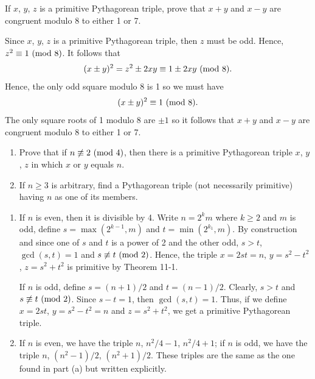 \begin{exercise}
    If $x$, $y$, $z$ is a primitive Pythagorean triple, prove that $x + y$ and $x-y$ are congruent modulo 8 to either 1 or 7. \\
\end{exercise}

\begin{solution}
    Since $x$, $y$, $z$ is a primitive Pythagorean triple, then $z$ must be odd. Hence, $z^2 \equiv 1 \ (\mathrm{mod}\ 8)$. It follows that
    $$(x\pm y)^2 = z^2 \pm 2xy \equiv 1 \pm 2xy \ (\mathrm{mod}\ 8).$$
    Hence, the only odd square modulo 8 is 1 so we must have
    $$(x \pm y)^2 \equiv 1 \ (\mathrm{mod}\ 8).$$
    The only square roots of 1 modulo 8 are $\pm 1$ so it follows that $x + y$ and $x-y$ are congruent modulo 8 to either 1 or 7. \\
\end{solution}

\begin{exercise}
    \begin{enumerate}
        \item Prove that if $n \not\equiv 2 \ (\mathrm{mod}\ 4)$, then there is a primitive Pythagorean triple $x$, $y$, $z$ in which $x$ or $y$ equals $n$.
        \item If $n \geq 3$ is arbitrary, find a Pythagorean triple (not necessarily primitive) having $n$ as one of its members.  \\
    \end{enumerate}
\end{exercise}

\begin{solution}
    \begin{enumerate}
        \item If $n$ is even, then it is divisible by 4. Write $n = 2^k m$ where $k \geq 2$ and $m$ is odd, define $s = \max(2^{k-1}, m)$ and $t = \min(2^{k_1}, m)$. By construction and since one of $s$ and $t$ is a power of 2 and the other odd, $s>t$, $\gcd(s,t) = 1$ and $s\not\equiv t \ (\mathrm{mod}\ 2)$. Hence, the triple $x = 2st = n$, $y = s^2 - t^2$, $z = s^2 + t^2$ is primitive by Theorem 11-1.
        
        If $n$ is odd, define $s = (n+1)/2$ and $t = (n-1)/2$. Clearly, $s > t$ and $s \not\equiv t \ (\mathrm{mod}\ 2)$. Since $s - t = 1$, then $\gcd(s,t) = 1$. Thus, if we define $x = 2st$, $y = s^2 - t^2 = n$ and $z = s^2 + t^2$, we get a primitive Pythagorean triple.
        \item If $n$ is even, we have the triple $n$, $n^2/4-1$, $n^2/4 + 1$; if $n$ is odd, we have the triple $n$, $(n^2-1)/2$, $(n^2+1)/2$. These triples are the same as the one found in part (a) but written explicitly.  \\
    \end{enumerate}
\end{solution}

